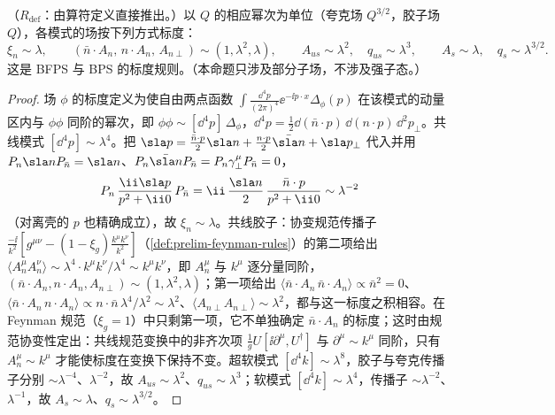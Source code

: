 \begin{proposition}\label{prop:scet-scalings}
（$R_{\mathrm{def}}$：由算符定义直接推出。）以 $Q$ 的相应幂次为单位（夸克场 $Q^{3/2}$，胶子场 $Q$），各模式的场按下列方式标度：
\begin{equation}\label{eq:scet-fieldscaling}
\xi_n\sim\lambda,\qquad (\bar n\cdot A_n,\,n\cdot A_n,\,A_{n\perp})\sim(1,\lambda^2,\lambda),\qquad
A_{us}\sim\lambda^2,\quad q_{us}\sim\lambda^3,\qquad A_s\sim\lambda,\quad q_s\sim\lambda^{3/2}.
\end{equation}
这是 BFPS 与 BPS 的标度规则\cite{BauerEtAl2001,Bauer:2002uv}。（本命题只涉及部分子场，不涉及强子态。）
\end{proposition}

\begin{proof}
场 $\phi$ 的标度定义为使自由两点函数 $\int\frac{\dd^4p}{(2\pi)^4}\ee^{-\ii p\cdot x}\Delta_\phi(p)$ 在该模式的动量区内与 $\phi\phi$ 同阶的幂次，即 $\phi\phi\sim[\dd^4p]\,\Delta_\phi$，$\dd^4p=\frac12\dd(\bar n\cdot p)\,\dd(n\cdot p)\,\dd^2p_\perp$。共线模式 $[\dd^4p]\sim\lambda^4$。把 $\sla p=\frac{\bar n\cdot p}{2}\sla n+\frac{n\cdot p}{2}\bar{\sla n}+\sla p_\perp$ 代入并用 $P_n\sla nP_{\bar n}=\sla n$、$P_n\bar{\sla n}P_{\bar n}=P_n\gamma_\perp^\mu P_{\bar n}=0$，
\begin{equation}\label{eq:scet-xiprop}
P_n\,\frac{\ii\sla p}{p^2+\ii0}\,P_{\bar n}=\ii\,\frac{\sla n}{2}\,\frac{\bar n\cdot p}{p^2+\ii0}\sim\lambda^{-2}
\end{equation}
（对离壳的 $p$ 也精确成立），故 $\xi_n\sim\lambda$。共线胶子：协变规范传播子 $\frac{-\ii}{k^2}[g^{\mu\nu}-(1-\xi_g)\frac{k^\mu k^\nu}{k^2}]$（\cref{def:prelim-feynman-rules}）的第二项给出 $\langle A_n^\mu A_n^\nu\rangle\sim\lambda^4\cdot k^\mu k^\nu/\lambda^4\sim k^\mu k^\nu$，即 $A_n^\mu$ 与 $k^\mu$ 逐分量同阶，$(\bar n\cdot A_n,n\cdot A_n,A_{n\perp})\sim(1,\lambda^2,\lambda)$；第一项给出 $\langle\bar n\cdot A_n\,\bar n\cdot A_n\rangle\propto\bar n^2=0$、$\langle\bar n\cdot A_n\,n\cdot A_n\rangle\propto n\cdot\bar n\,\lambda^4/\lambda^2\sim\lambda^2$、$\langle A_{n\perp}A_{n\perp}\rangle\sim\lambda^2$，都与这一标度之积相容。在 Feynman 规范（$\xi_g=1$）中只剩第一项，它不单独确定 $\bar n\cdot A_n$ 的标度；这时由规范协变性定出：共线规范变换中的非齐次项 $\frac1gU[\ii\partial^\mu,U^\dagger]$ 与 $\partial^\mu\sim k^\mu$ 同阶，只有 $A_n^\mu\sim k^\mu$ 才能使标度在变换下保持不变。超软模式 $[\dd^4k]\sim\lambda^8$，胶子与夸克传播子分别 $\sim\lambda^{-4}$、$\lambda^{-2}$，故 $A_{us}\sim\lambda^2$、$q_{us}\sim\lambda^3$；软模式 $[\dd^4k]\sim\lambda^4$，传播子 $\sim\lambda^{-2}$、$\lambda^{-1}$，故 $A_s\sim\lambda$、$q_s\sim\lambda^{3/2}$。
\end{proof}

